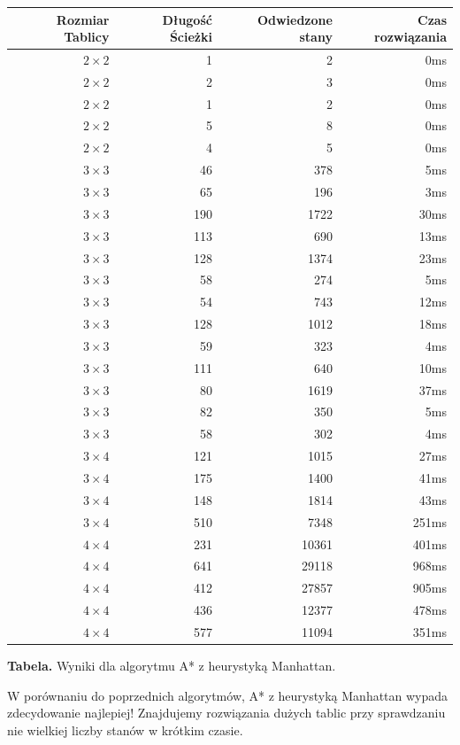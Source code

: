 \documentclass{classrep}
\begin{document}
\begin{center}
\begin{longtable}{|r|r|r|r|}
  \hline 
  Rozmiar Tablicy & Długość Ścieżki & Odwiedzone stany & Czas rozwiązania \\
	\hline
		$2 \times 2$ & 1 & 2 & 0ms \\
	\hline
		$2 \times 2$ & 2 & 3 & 0ms \\
	\hline
		$2 \times 2$ & 1 & 2 & 0ms \\
	\hline
		$2 \times 2$ & 5 & 8 & 0ms \\
	\hline
		$2 \times 2$ & 4 & 5 & 0ms \\
	\hline
		$3 \times 3$ & 46 & 378 & 5ms \\
	\hline
		$3 \times 3$ & 65 & 196 & 3ms \\
	\hline
		$3 \times 3$ & 190 & 1722 & 30ms \\
	\hline
		$3 \times 3$ & 113 & 690 & 13ms \\
	\hline
		$3 \times 3$ & 128 & 1374 & 23ms \\
	\hline
		$3 \times 3$ & 58 & 274 & 5ms \\
	\hline
		$3 \times 3$ & 54 & 743 & 12ms \\
	\hline
		$3 \times 3$ & 128 & 1012 & 18ms \\
	\hline
		$3 \times 3$ & 59 & 323 & 4ms \\
	\hline
		$3 \times 3$ & 111 & 640 & 10ms \\
	\hline
		$3 \times 3$ & 80 & 1619 & 37ms \\
	\hline
		$3 \times 3$ & 82 & 350 & 5ms \\
	\hline
		$3 \times 3$ & 58 & 302 & 4ms \\
	\hline
		$3 \times 4$ & 121 & 1015 & 27ms \\
	\hline
		$3 \times 4$ & 175 & 1400 & 41ms \\
	\hline
		$3 \times 4$ & 148 & 1814 & 43ms \\
	\hline
		$3 \times 4$ & 510 & 7348 & 251ms \\
	\hline
		$4 \times 4$ & 231 & 10361 & 401ms \\
	\hline
		$4 \times 4$ & 641 & 29118 & 968ms \\
	\hline
		$4 \times 4$ & 412 & 27857 & 905ms \\
	\hline
		$4 \times 4$ & 436 & 12377 & 478ms \\
	\hline
		$4 \times 4$ & 577 & 11094 & 351ms \\
	\hline
\end{longtable} 
\textbf{Tabela.} Wyniki dla algorytmu A* z heurystyką Manhattan.
\end{center}
W porównaniu do poprzednich algorytmów, A* z heurystyką Manhattan wypada zdecydowanie najlepiej! Znajdujemy rozwiązania dużych tablic przy sprawdzaniu nie wielkiej liczby stanów w krótkim czasie.
\end{document}
